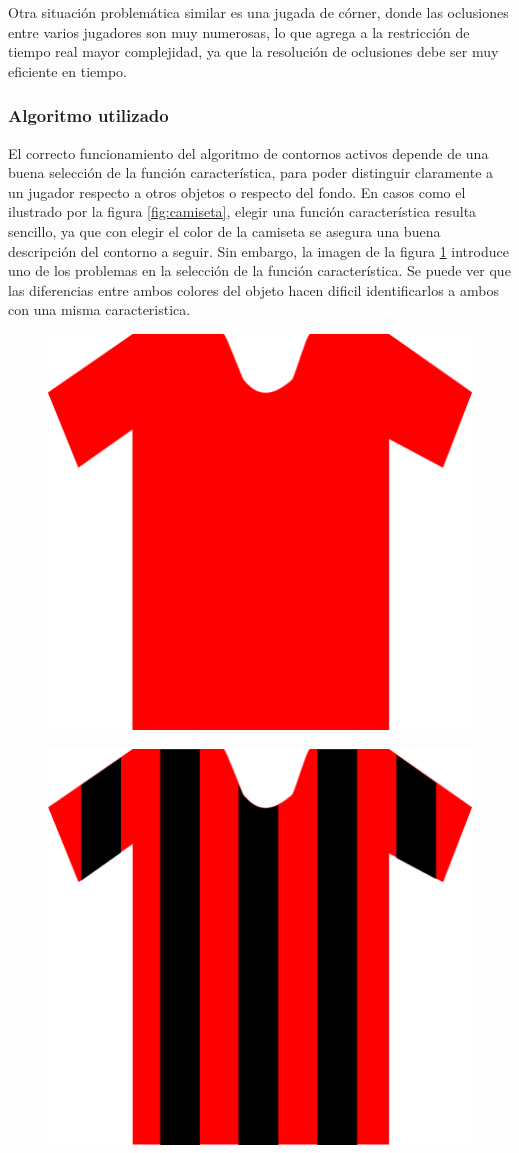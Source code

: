 Otra situación problemática similar es una jugada de córner, donde las
oclusiones entre varios jugadores son muy numerosas, lo que agrega a la
restricción de tiempo real mayor complejidad, ya que la resolución de
oclusiones debe ser muy eficiente en tiempo.

\subsubsection{Algoritmo utilizado}

El correcto funcionamiento del algoritmo de contornos
activos\cite{fast-level-set} depende de una buena selección de la función
característica, para poder distinguir claramente a un jugador respecto a otros
objetos o respecto del fondo. En casos como el ilustrado por la figura
\ref{fig:camiseta}, elegir una función característica resulta sencillo, ya que
con elegir el color de la camiseta se asegura una buena descripción del contorno
a seguir. Sin embargo, la imagen de la figura \ref{fig:camiseta-rayada} introduce
uno de los problemas en la selección de la función característica. Se puede ver que
las diferencias entre ambos colores del objeto hacen dificil identificarlos a ambos
con una misma caracteristica.

\begin{figure}[H]
    \centering
    \begin{minipage}[t]{.5\textwidth}
        \centering
        \includegraphics[width=.4\linewidth]{./images/rect2995.png}
        \label{fig:camiseta}
    \end{minipage}%
    \begin{minipage}[t]{.5\textwidth}
        \centering
        \includegraphics[width=.4\linewidth]{./images/rect2996.png}
        \label{fig:camiseta-rayada}
    \end{minipage}
\end{figure}

